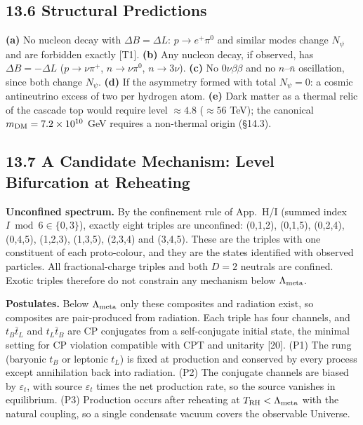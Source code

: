 \documentclass[11pt,letterpaper]{article}
\begin{document}
\subsection*{13.6  Structural Predictions}

\noindent \textbf{(a) }No nucleon decay with $\Delta B=\Delta L$: $p\to e^+\pi^0$ and similar modes change $N_\psi$ and are forbidden exactly [T1]. \textbf{(b) }Any nucleon decay, if observed, has $\Delta B=-\Delta L$ ($p\to\nu\pi^+$, $n\to\nu\pi^0$, $n\to3\nu$). \textbf{(c) }No $0\nu\beta\beta$ and no $n$--$\bar n$ oscillation, since both change $N_\psi$. \textbf{(d) }If the asymmetry formed with total $N_\psi=0$: a cosmic antineutrino excess of two per hydrogen atom. \textbf{(e) }Dark matter as a thermal relic of the cascade top would require level $\approx4.8$ ($\approx56$ TeV); the canonical $m_{\rm DM}=7.2\times10^{10}$ GeV requires a non-thermal origin (§14.3).

\subsection*{13.7  A Candidate Mechanism: Level Bifurcation at Reheating}

\noindent \textbf{Unconfined spectrum. }By the confinement rule of App.~H/I (summed index $I \bmod 6\in\{0,3\}$), exactly eight triples are unconfined: (0,1,2), (0,1,5), (0,2,4), (0,4,5), (1,2,3), (1,3,5), (2,3,4) and (3,4,5). These are the triples with one constituent of each proto-colour, and they are the states identified with observed particles. All fractional-charge triples and both $D=2$ neutrals are confined. Exotic triples therefore do not constrain any mechanism below $\Lambda_{\rm meta}$.

\noindent \textbf{Postulates. }Below $\Lambda_{\rm meta}$ only these composites and radiation exist, so composites are pair-produced from radiation. Each triple has four channels, and $t_B\bar t_L$ and $t_L\bar t_B$ are CP conjugates from a self-conjugate initial state, the minimal setting for CP violation compatible with CPT and unitarity [20]. (P1) The rung (baryonic $t_B$ or leptonic $t_L$) is fixed at production and conserved by every process except annihilation back into radiation. (P2) The conjugate channels are biased by $\varepsilon_t$, with source $\varepsilon_t$ times the net production rate, so the source vanishes in equilibrium. (P3) Production occurs after reheating at $T_{\rm RH}<\Lambda_{\rm meta}$ with the natural coupling, so a single condensate vacuum covers the observable Universe.
\end{document}
